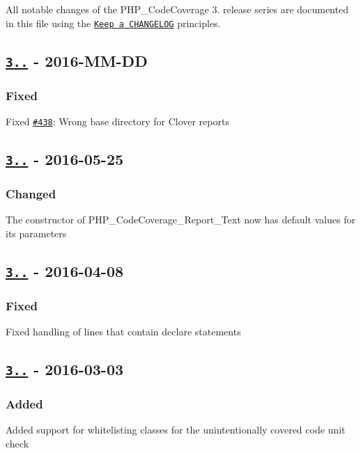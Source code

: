 All notable changes of the P\+H\+P\+\_\+\+Code\+Coverage 3. release series are documented in this file using the \href{http://keepachangelog.com/}{\tt Keep a C\+H\+A\+N\+G\+E\+L\+OG} principles.

\subsection*{\href{https://github.com/sebastianbergmann/php-code-coverage/compare/3.3.2...3.3.3}{\tt 3..} -\/ 2016-\/\+M\+M-\/\+DD}

\subsubsection*{Fixed}


\begin{DoxyItemize}
\item Fixed \href{https://github.com/sebastianbergmann/php-code-coverage/issues/438}{\tt \#438}\+: Wrong base directory for Clover reports
\end{DoxyItemize}

\subsection*{\href{https://github.com/sebastianbergmann/php-code-coverage/compare/3.3.1...3.3.2}{\tt 3..} -\/ 2016-\/05-\/25}

\subsubsection*{Changed}


\begin{DoxyItemize}
\item The constructor of {\ttfamily P\+H\+P\+\_\+\+Code\+Coverage\+\_\+\+Report\+\_\+\+Text} now has default values for its parameters
\end{DoxyItemize}

\subsection*{\href{https://github.com/sebastianbergmann/php-code-coverage/compare/3.3.0...3.3.1}{\tt 3..} -\/ 2016-\/04-\/08}

\subsubsection*{Fixed}


\begin{DoxyItemize}
\item Fixed handling of lines that contain {\ttfamily declare} statements
\end{DoxyItemize}

\subsection*{\href{https://github.com/sebastianbergmann/php-code-coverage/compare/3.2...3.3.0}{\tt 3..} -\/ 2016-\/03-\/03}

\subsubsection*{Added}


\begin{DoxyItemize}
\item Added support for whitelisting classes for the unintentionally covered code unit check 
\end{DoxyItemize}